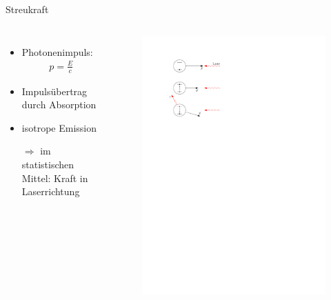\documentclass[12pt,xcolor=dvipsnames,professionalfonts]{beamer}
\begin{document}
\begin{frame}{Streukraft}
	\begin{columns}[c]
		\begin{itemize}
			\setlength\itemsep{1em}
			\item Photonenimpuls:
			\begin{align*}
				p = \frac{E}{c}
			\end{align*}
			\item Impulsübertrag durch Absorption
			
			\item isotrope Emission
			
			\item[$\Rightarrow$] im statistischen Mittel: Kraft in Laserrichtung
		\end{itemize}
		
		\begin{figure}[h]
			\centering
			\vspace{-1cm}
			\includegraphics[width=1.0\textwidth]{./figures/streukraft.pdf}
		\end{figure}
		
	\end{columns}

\end{frame}
\end{document}
